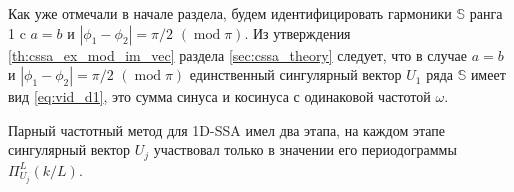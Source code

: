 \documentclass[specialist,
               substylefile = spbu.rtx,
               subf,href,colorlinks=true, 12pt]{disser}
\def\mod{\mathop{\mathrm{mod}}}
\begin{document}
Как уже отмечали в начале раздела, будем идентифицировать гармоники $\mathbb{S}$ ранга 1 c $a=b$ и $|\phi_1 - \phi_2| = \pi/2 \,\,(\mod \pi)$.
 Из утверждения \ref{th:cssa_ex_mod_im_vec} раздела \ref{sec:cssa_theory} следует, что в случае $a=b$ и $|\phi_1 - \phi_2| = \pi/2 \,\,(\mod \pi)$ единственный сингулярный вектор $U_1$ ряда $\mathbb{S}$ имеет вид \eqref{eq:vid_d1}, это сумма синуса и косинуса с одинаковой частотой $\omega$.

Парный частотный метод для 1D-SSA имел два этапа, на каждом этапе сингулярный вектор $U_j$ участвовал только в значении его периодограммы $\Pi_{U_j}^L(k/L)$.
\end{document}
